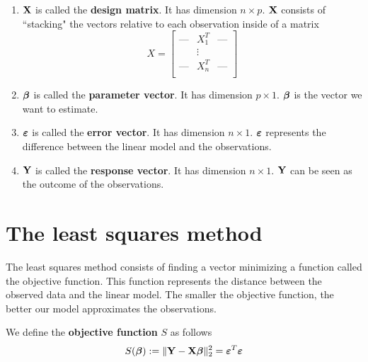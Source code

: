 \begin{definition}
    \begin{enumerate}[label=(\alph*)]
        \item $\mathbf{X}$ is called the \textbf{design matrix}. It has dimension $n \times p$. $\mathbf{X}$ consists of ``stacking" the vectors relative to each observation inside of a matrix
              \[
                  X =
                  \begin{bmatrix}
                      \text{---} & X_1^T  & \text{---} \\
                                 & \vdots &            \\
                      \text{---} & X_n^T  & \text{---} \\
                  \end{bmatrix}
              \]
        \item $\boldsymbol{\beta}$ is called the \textbf{parameter vector}. It has dimension $p \times 1$. \(\boldsymbol{\beta}\) is the vector we want to estimate.
        \item $\boldsymbol{\varepsilon}$ is called the \textbf{error vector}. It has dimension $n \times 1$. \(\boldsymbol{\varepsilon}\) represents the difference between the linear model and the observations.
        \item $\mathbf{Y}$ is called the \textbf{response vector}. It has dimension $n \times 1$. \(\mathbf{Y}\) can be seen as the outcome of the observations.
    \end{enumerate}
\end{definition}


\section{The least squares method}
\label{section: least-squares}

The least squares method consists of finding a vector minimizing a function called the objective function. This function represents the distance between the observed data and the linear model. The smaller the objective function, the better our model approximates the observations.

\begin{definition}
    We define the \textbf{objective function} \( S \) as follows
    \begin{equation}
        \label{eqn: least squares objective function}
        S(\boldsymbol{\beta}) := \| \mathbf{Y}-\mathbf{X} \boldsymbol{\beta} \|_2^2 = \boldsymbol{\varepsilon}^{T} \boldsymbol{\varepsilon}
    \end{equation}
\end{definition}

